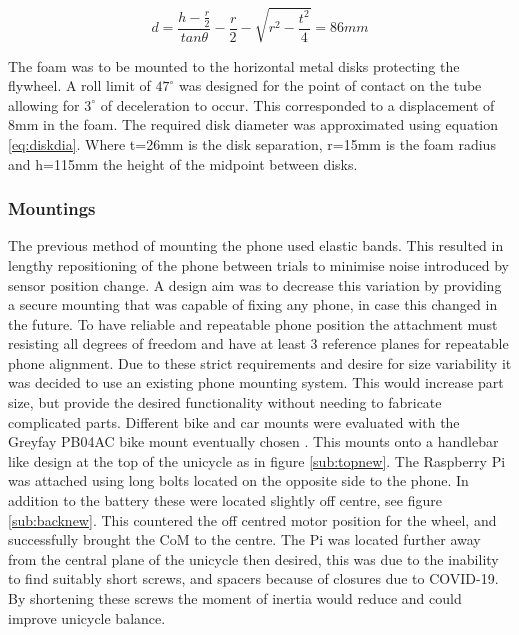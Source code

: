 \documentclass[twoside,twocolumn,12pt]{article}
\begin{document}
\begin{equation}
d =\frac{h-\frac{r}{2}}{tan\theta} - \frac{r}{2} - \sqrt{r^2-\frac{t^2}{4}} = 86mm
\label{eq:diskdia}
\end{equation}

The foam was to be mounted to the horizontal metal disks protecting the flywheel. A roll limit of $47^{\circ}$ was designed for the point of contact on the tube allowing for $3^{\circ}$ of deceleration to occur. This corresponded to a displacement of 8mm in the foam. The required disk diameter was approximated using equation \ref{eq:diskdia}. Where t=26mm is the disk separation, r=15mm is the foam radius and h=115mm the height of the midpoint between disks.

\subsubsection{Mountings}
The previous method of mounting the phone used elastic bands. This resulted in lengthy repositioning of the phone between trials to minimise noise introduced by sensor position change. A design aim was to decrease this variation by providing a secure mounting that was capable of fixing any phone, in case this changed in the future. 
\newline
To have reliable and repeatable phone position the attachment must resisting all degrees of freedom and have at least 3 reference planes for repeatable phone alignment. Due to these strict requirements and desire for size variability it was decided to use an existing phone mounting system. This would increase part size, but provide the desired functionality without needing to fabricate complicated parts. Different bike and car mounts were evaluated with the Greyfay PB04AC bike mount eventually chosen \cite{bike}. This mounts onto a handlebar like design at the top of the unicycle as in figure \ref{sub:topnew}. 
\newline
The Raspberry Pi was attached using long bolts located on the opposite side to the phone. In addition to the battery these were located slightly off centre, see figure \ref{sub:backnew}. This countered the off centred motor position for the wheel, and successfully brought the CoM to the centre. The Pi was located further away from the central plane of the unicycle then desired, this was due to the inability to find suitably short screws, and spacers because of closures due to COVID-19. By shortening these screws the moment of inertia would reduce and could improve unicycle balance.  
\end{document}
